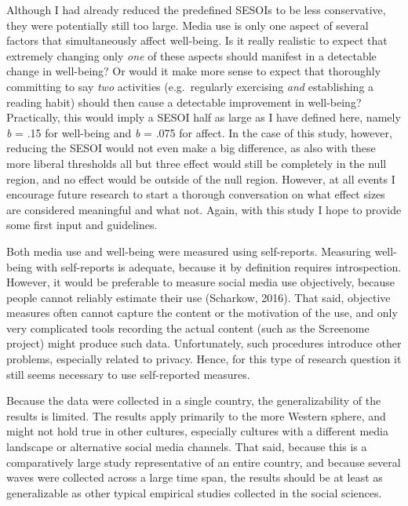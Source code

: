 \documentclass[
  english,
  man,floatsintext]{apa6}
\begin{document}
Although I had already reduced the predefined SESOIs to be less conservative, they were potentially still too large.
Media use is only one aspect of several factors that simultaneously affect well-being.
Is it really realistic to expect that extremely changing only \emph{one} of these aspects should manifest in a detectable change in well-being?
Or would it make more sense to expect that thoroughly committing to say \emph{two} activities (e.g.~regularly exercising \emph{and} establishing a reading habit) should then cause a detectable improvement in well-being?
Practically, this would imply a SESOI half as large as I have defined here, namely \emph{b} = \textbar.15\textbar{} for well-being and \emph{b} = \textbar.075\textbar{} for affect.
In the case of this study, however, reducing the SESOI would not even make a big difference, as also with these more liberal thresholds all but three effect would still be completely in the null region, and no effect would be outside of the null region.
However, at all events I encourage future research to start a thorough conversation on what effect sizes are considered meaningful and what not.
Again, with this study I hope to provide some first input and guidelines.

Both media use and well-being were measured using self-reports.
Measuring well-being with self-reports is adequate, because it by definition requires introspection.
However, it would be preferable to measure social media use objectively, because people cannot reliably estimate their use (Scharkow, 2016).
That said, objective measures often cannot capture the content or the motivation of the use, and only very complicated tools recording the actual content (such as the Screenome project) might produce such data.
Unfortunately, such procedures introduce other problems, especially related to privacy.
Hence, for this type of research question it still seems necessary to use self-reported measures.

Because the data were collected in a single country, the generalizability of the results is limited.
The results apply primarily to the more Western sphere, and might not hold true in other cultures, especially cultures with a different media landscape or alternative social media channels.
That said, because this is a comparatively large study representative of an entire country, and because several waves were collected across a large time span, the results should be at least as generalizable as other typical empirical studies collected in the social sciences.
\end{document}
